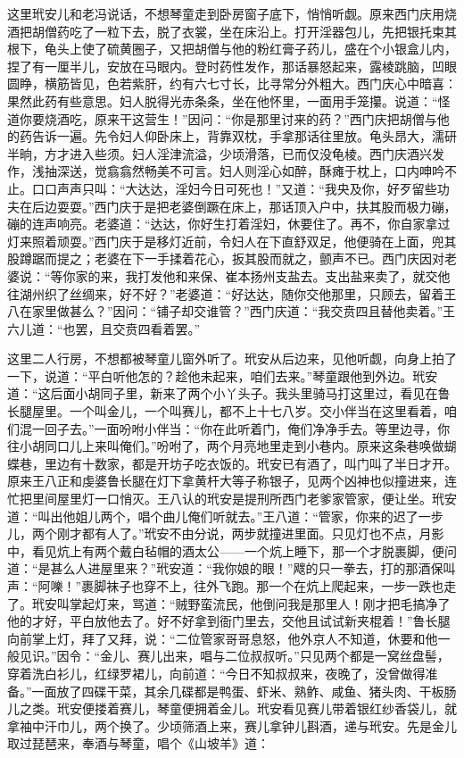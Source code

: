 这里玳安儿和老冯说话，不想琴童走到卧房窗子底下，悄悄听觑。原来西门庆用烧酒把胡僧药吃了一粒下去，脱了衣裳，坐在床沿上。打开淫器包儿，先把银托束其根下，龟头上使了硫黄圈子，又把胡僧与他的粉红膏子药儿，盛在个小银盒儿内，捏了有一厘半儿，安放在马眼内。登时药性发作，那话暴怒起来，露棱跳脑，凹眼圆睁，横筋皆见，色若紫肝，约有六七寸长，比寻常分外粗大。西门庆心中暗喜：果然此药有些意思。妇人脱得光赤条条，坐在他怀里，一面用手笼攥。说道：“怪道你要烧酒吃，原来干这营生！”因问：“你是那里讨来的药？”西门庆把胡僧与他的药告诉一遍。先令妇人仰卧床上，背靠双枕，手拿那话往里放。龟头昂大，濡研半晌，方才进入些须。妇人淫津流溢，少顷滑落，已而仅没龟棱。西门庆酒兴发作，浅抽深送，觉翕翕然畅美不可言。妇人则淫心如醉，酥瘫于枕上，口内呻吟不止。口口声声只叫：“大达达，淫妇今日可死也！”又道：“我央及你，好歹留些功夫在后边耍耍。”西门庆于是把老婆倒蹶在床上，那话顶入户中，扶其股而极力磞，磞的连声响亮。老婆道：“达达，你好生打着淫妇，休要住了。再不，你自家拿过灯来照着顽耍。”西门庆于是移灯近前，令妇人在下直舒双足，他便骑在上面，兜其股蹲踞而提之；老婆在下一手揉着花心，扳其股而就之，颤声不已。西门庆因对老婆说：“等你家的来，我打发他和来保、崔本扬州支盐去。支出盐来卖了，就交他往湖州织了丝绸来，好不好？”老婆道：“好达达，随你交他那里，只顾去，留着王八在家里做甚么？”因问：“铺子却交谁管？”西门庆道：“我交贲四且替他卖着。”王六儿道：“也罢，且交贲四看着罢。”

这里二人行房，不想都被琴童儿窗外听了。玳安从后边来，见他听觑，向身上拍了一下，说道：“平白听他怎的？趁他未起来，咱们去来。”琴童跟他到外边。玳安道：“这后面小胡同子里，新来了两个小丫头子。我头里骑马打这里过，看见在鲁长腿屋里。一个叫金儿，一个叫赛儿，都不上十七八岁。交小伴当在这里看着，咱们混一回子去。”一面吩咐小伴当：“你在此听着门，俺们净净手去。等里边寻，你往小胡同口儿上来叫俺们。”吩咐了，两个月亮地里走到小巷内。原来这条巷唤做蝴蝶巷，里边有十数家，都是开坊子吃衣饭的。玳安已有酒了，叫门叫了半日才开。原来王八正和虔婆鲁长腿在灯下拿黄杆大等子称银子，见两个凶神也似撞进来，连忙把里间屋里灯一口悄灭。王八认的玳安是提刑所西门老爹家管家，便让坐。玳安道：“叫出他姐儿两个，唱个曲儿俺们听就去。”王八道：“管家，你来的迟了一步儿，两个刚才都有人了。”玳安不由分说，两步就撞进里面。只见灯也不点，月影中，看见炕上有两个戴白毡帽的酒太公——一个炕上睡下，那一个才脱裹脚，便问道：“是甚么人进屋里来？”玳安道：“我你娘的眼！”飕的只一拳去，打的那酒保叫声：“阿嚛！”裹脚袜子也穿不上，往外飞跑。那一个在炕上爬起来，一步一跌也走了。玳安叫掌起灯来，骂道：“贼野蛮流民，他倒问我是那里人！刚才把毛搞净了他的才好，平白放他去了。好不好拿到衙门里去，交他且试试新夹棍着！”鲁长腿向前掌上灯，拜了又拜，说：“二位管家哥哥息怒，他外京人不知道，休要和他一般见识。”因令：“金儿、赛儿出来，唱与二位叔叔听。”只见两个都是一窝丝盘髻，穿着洗白衫儿，红绿罗裙儿，向前道：“今日不知叔叔来，夜晚了，没曾做得准备。”一面放了四碟干菜，其余几碟都是鸭蛋、虾米、熟鲊、咸鱼、猪头肉、干板肠儿之类。玳安便搂着赛儿，琴童便拥着金儿。玳安看见赛儿带着银红纱香袋儿，就拿袖中汗巾儿，两个换了。少顷筛酒上来，赛儿拿钟儿斟酒，递与玳安。先是金儿取过琵琶来，奉酒与琴童，唱个《山坡羊》道：

